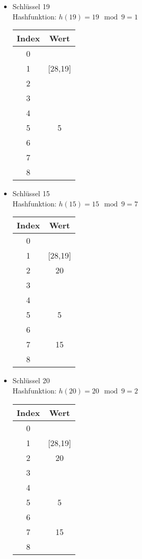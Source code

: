 \begin{multicols}{2}
\begin{itemize}
\item Schlüssel 19\\
Hashfunktion: $h(19) = 19 \mod 9 = 1$

\begin{center}
\begin{tabular}{c|c}
Index & Wert \\
\hline
0 & \\
1 & [28,19]\\
2 & \\
3 & \\
4 & \\
5 & 5\\
6 & \\
7 & \\
8 & \\
\end{tabular}
\end{center}

\item Schlüssel 15\\
Hashfunktion: $h(15) = 15 \mod 9 = 7$

\begin{center}
\begin{tabular}{c|c}
Index & Wert \\
\hline
0 & \\
1 & [28,19]\\
2 & 20\\
3 & \\
4 & \\
5 & 5\\
6 & \\
7 & 15\\
8 & \\
\end{tabular}
\end{center}

\item Schlüssel 20\\
Hashfunktion: $h(20) = 20 \mod 9 = 2$

\begin{center}
\begin{tabular}{c|c}
Index & Wert \\
\hline
0 & \\
1 & [28,19]\\
2 & 20\\
3 & \\
4 & \\
5 & 5\\
6 & \\
7 & 15\\
8 & \\
\end{tabular}
\end{center}


\end{itemize}
\end{multicols}
